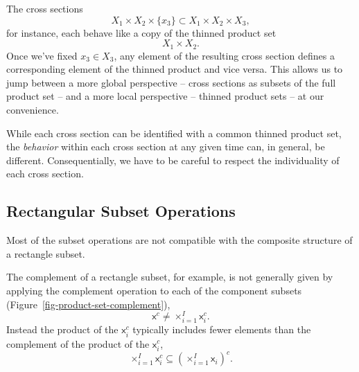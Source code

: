 \documentclass[
  letterpaper,
  DIV=11,
  numbers=noendperiod]{scrartcl}
\begin{document}
The cross sections \[
X_{1} \times X_{2} \times \{ x_{3} \}
\subset
X_{1} \times X_{2} \times X_{3},
\] for instance, each behave like a copy of the thinned product set \[
X_{1} \times X_{2}.
\] Once we've fixed \(x_{3} \in X_{3}\), any element of the resulting
cross section defines a corresponding element of the thinned product and
vice versa. This allows us to jump between a more global perspective --
cross sections as subsets of the full product set -- and a more local
perspective -- thinned product sets -- at our convenience.

While each cross section can be identified with a common thinned product
set, the \emph{behavior} within each cross section at any given time
can, in general, be different. Consequentially, we have to be careful to
respect the individuality of each cross section.

\subsection{Rectangular Subset
Operations}\label{rectangular-subset-operations}

Most of the subset operations are not compatible with the composite
structure of a rectangle subset.

The complement of a rectangle subset, for example, is not generally
given by applying the complement operation to each of the component
subsets (Figure~\ref{fig-product-set-complement}), \[
\mathsf{x}^{c} \ne \times_{i = 1}^{I} \mathsf{x}_{i}^{c}.
\] Instead the product of the \(\mathsf{x}_{i}^{c}\) typically includes
fewer elements than the complement of the product of the
\(\mathsf{x}_{i}^{c}\), \[
\times_{i = 1}^{I} \mathsf{x}_{i}^{c}
\subseteq
\left(
\times_{i = 1}^{I} \mathsf{x}_{i}
\right)^{c}.
\]
\end{document}
